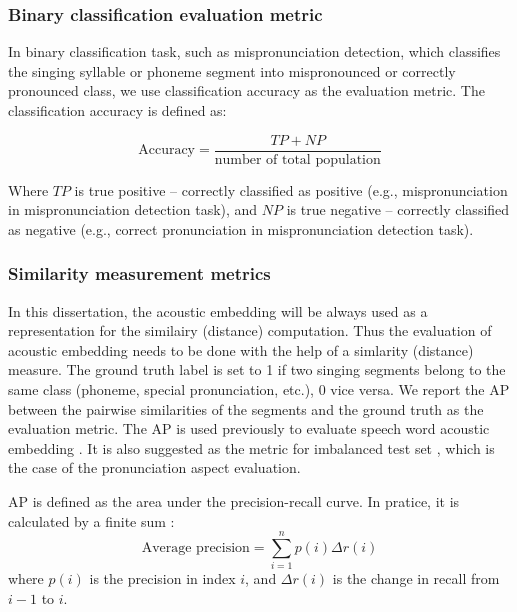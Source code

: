 \subsubsection{Binary classification evaluation metric}\label{sec:ch2:binary_classification_metric}

In binary classification task, such as mispronunciation detection, which classifies the singing syllable or phoneme segment into mispronounced or correctly pronounced class, we use classification accuracy as the evaluation metric. The classification accuracy is defined as:

\begin{equation}
\textrm{Accuracy} = \frac{TP + NP}{\textrm{number of total population}}
\end{equation}

Where $TP$ is true positive -- correctly classified as positive (e.g., mispronunciation in mispronunciation detection task), and $NP$ is true negative -- correctly classified as negative (e.g., correct pronunciation in mispronunciation detection task). 

\subsubsection{Similarity measurement metrics}

In this dissertation, the acoustic embedding will be always used as a representation for the similairy (distance) computation. Thus the evaluation of acoustic embedding needs to be done with the help of a simlarity (distance) measure. The ground truth label is set to 1 if two singing segments belong to the same class (phoneme, special pronunciation, etc.), 0 vice versa. We report the \gls{AP} between the pairwise similarities of the segments and the ground truth as the evaluation metric. The \gls{AP} is used previously to evaluate speech word acoustic embedding \cite{Kampera,Settle2016a}. It is also suggested as the metric for imbalanced test set \cite{Davis2006}, which is the case of the pronunciation aspect evaluation.

\gls{AP} is defined as the area under the precision-recall curve. In pratice, it is calculated by a finite sum :
\begin{equation}
\textrm{Average precision} = \sum_{i=1}^{n} p(i)\Delta r(i)
\end{equation} 
where $p(i)$ is the precision in index $i$, and  $\Delta r(i)$ is the change in recall from $i-1$ to $i$.

